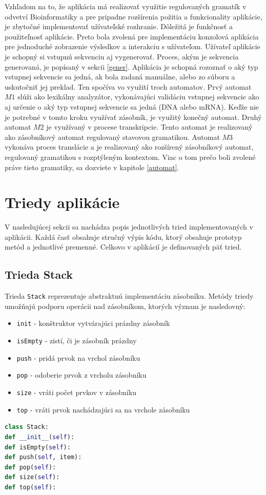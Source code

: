 Vzhľadom na to, že aplikácia má realizovať využitie regulovaných gramatík v odvetví Bioinformatiky a pre pripadne rozšírenia požitia a funkcionality aplikácie, je zbytočné implementovať užívateľské rozhranie. Dôležitá je funkčnosť a použiteľnosť aplikácie. Preto bola zvolená pre implementáciu konzolová aplikácia pre jednoduché zobrazenie výsledkov a interakciu s užívateľom. 
Užívateľ aplikácie je schopný si vstupnú sekvenciu aj vygenerovať. Proces, akým je sekvencia generovaná, je popísaný v sekcii \ref{gener}. Aplikácia je schopná rozoznať o aký typ vstupnej sekvencie sa jedná, ak bola zadaná manuálne, alebo zo súboru a uskutočniť jej preklad. Ten spočíva vo využití troch automatov. Prvý automat $M1$ slúži ako lexikálny analyzátor, vykonávajúci validáciu vstupnej sekvencie ako aj určenie o aký typ vstupnej sekvencie sa jedná (DNA alebo mRNA). Keďže nie je potrebné v tomto kroku využívať zásobník, je využitý konečný automat. Druhý automat $M2$ je využívaný v procese transkripcie. Tento automat je realizovaný ako zásobníkový automat regulovaný stavovou gramatikou. Automat $M3$ vykonáva proces translácie a je realizovaný ako rozšírený zásobníkový automat, regulovaný gramatikou s rozptýleným kontextom. Viac o tom prečo boli zvolené práve tieto gramatiky, sa dozviete v kapitole \ref{automat}.
\section{Triedy aplikácie}
V nasledujúcej sekcii sa nachádza popis jednotlivých tried implementovaných v aplikácii. Každá časť obsahuje stručný výpis kódu, ktorý obsahuje prototyp metód a jednotlivé premenné. Celkovo v aplikácií je definovaných päť tried.

\subsection{Trieda Stack}
\label{stack}
Trieda \texttt{Stack} reprezentuje abstraktnú implementáciu zásobníku. Metódy triedy umožňujú podporu operácii nad zásobníkom, ktorých význam je nasledovný:
\begin{itemize}
\item \texttt{init} - konštruktor vytvárajúci prázdny zásobník
\item \texttt{isEmpty} - zistí, či je zásobník prázdny
\item \texttt{push} - pridá prvok na vrchol zásobníku
\item \texttt{pop} - odoberie prvok z vrcholu zásobníku
\item \texttt{size} - vráti počet prvkov v zásobníku
\item \texttt{top} - vráti prvok nachádzajúci sa na vrchole zásobníku
\end{itemize} 
\begin{lstlisting}[language=Python, caption=Metódy triedy \texttt{Stack}]
class Stack:
def __init__(self):
def isEmpty(self):
def push(self, item):
def pop(self):
def size(self):
def top(self):
\end{lstlisting}

